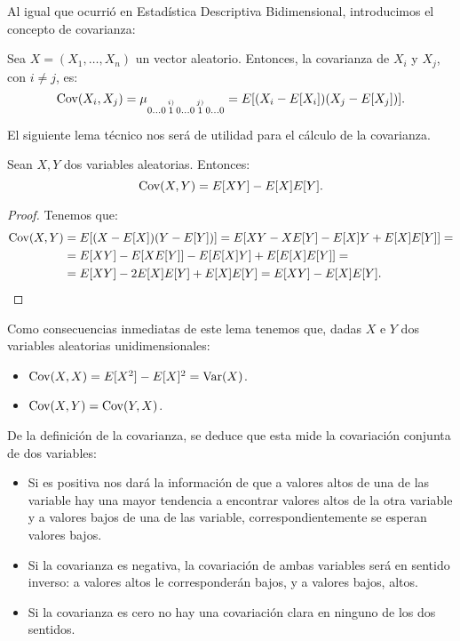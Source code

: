 Al igual que ocurrió en Estadística Descriptiva Bidimensional, introducimos el concepto de covarianza:
\begin{definicion}[Covarianza]
    Sea $X=(X_1,\dots,X_n)$ un vector aleatorio. Entonces, la covarianza de $X_i$ y $X_j$, con $i\neq j$, es:
    \begin{equation*}
        \operatorname{Cov}(X_i,X_j) = \mu_{0 \dots 0 \, \overset{i)}{1} \, 0 \dots 0 \, \overset{j)}{1} \, 0 \dots 0} = E[(X_i-E[X_i])(X_j-E[X_j])].
    \end{equation*}
\end{definicion}
El siguiente lema técnico nos será de utilidad para el cálculo de la covarianza.
\begin{lema}
    Sean $X,Y$ dos variables aleatorias. Entonces:
    \begin{equation*}
        \operatorname{Cov}(X,Y) = E[XY] - E[X]E[Y].
    \end{equation*}
\end{lema}
\begin{proof}
    Tenemos que:
    \begin{align*}
        \operatorname{Cov}(X,Y) &= E[(X-E[X])(Y-E[Y])] = E[XY - XE[Y] - E[X]Y + E[X]E[Y]] =\\
        &= E[XY] - E[XE[Y]] - E[E[X]Y] + E[E[X]E[Y]] =\\
        &= E[XY] - 2E[X]E[Y] + E[X]E[Y] = E[XY] - E[X]E[Y].
    \end{align*}
\end{proof}

Como consecuencias inmediatas de este lema tenemos que, dadas $X$ e $Y$ dos variables aleatorias unidimensionales:
\begin{itemize}
    \item $\operatorname{Cov}(X,X) = E[X^2] - E[X]^2 = \operatorname{Var}(X)$.
    \item $\operatorname{Cov}(X,Y) = \operatorname{Cov}(Y,X)$.
\end{itemize}

De la definición de la covarianza, se deduce que esta mide la covariación conjunta de dos variables:
\begin{itemize}
    \item Si es positiva nos dará la información de que a valores altos de una de las variable hay una mayor tendencia a encontrar valores altos de la otra variable y a valores bajos de una de las variable, correspondientemente se esperan valores bajos.
    \item Si la covarianza es negativa, la covariación de ambas variables será en sentido inverso: a valores altos le corresponderán bajos, y a valores bajos, altos.
    \item Si la covarianza es cero no hay una covariación clara en ninguno de los dos sentidos.
\end{itemize}


